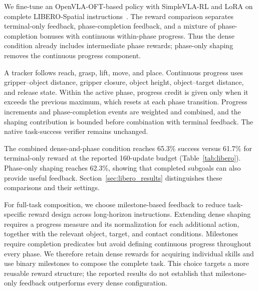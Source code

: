 \label{sec:dense_method}
We fine-tune an OpenVLA-OFT-based policy with SimpleVLA-RL and LoRA on complete LIBERO-Spatial instructions~\cite{openvlaoft,simplevlarl,libero}. The reward comparison separates terminal-only feedback, phase-completion feedback, and a mixture of phase-completion bonuses with continuous within-phase progress. Thus the dense condition already includes intermediate phase rewards; phase-only shaping removes the continuous progress component.

A tracker follows reach, grasp, lift, move, and place. Continuous progress uses gripper--object distance, gripper closure, object height, object--target distance, and release state. Within the active phase, progress credit is given only when it exceeds the previous maximum, which resets at each phase transition. Progress increments and phase-completion events are weighted and combined, and the shaping contribution is bounded before combination with terminal feedback. The native task-success verifier remains unchanged.

The combined dense-and-phase condition reaches 65.3\% success versus 61.7\% for terminal-only reward at the reported 160-update budget (Table~\ref{tab:libero}). Phase-only shaping reaches 62.3\%, showing that completed subgoals can also provide useful feedback. Section~\ref{sec:libero_results} distinguishes these comparisons and their settings.

For full-task composition, we choose milestone-based feedback to reduce task-specific reward design across long-horizon instructions. Extending dense shaping requires a progress measure and its normalization for each additional action, together with the relevant object, target, and contact conditions. Milestones require completion predicates but avoid defining continuous progress throughout every phase. We therefore retain dense rewards for acquiring individual skills and use binary milestones to compose the complete task. This choice targets a more reusable reward structure; the reported results do not establish that milestone-only feedback outperforms every dense configuration.
